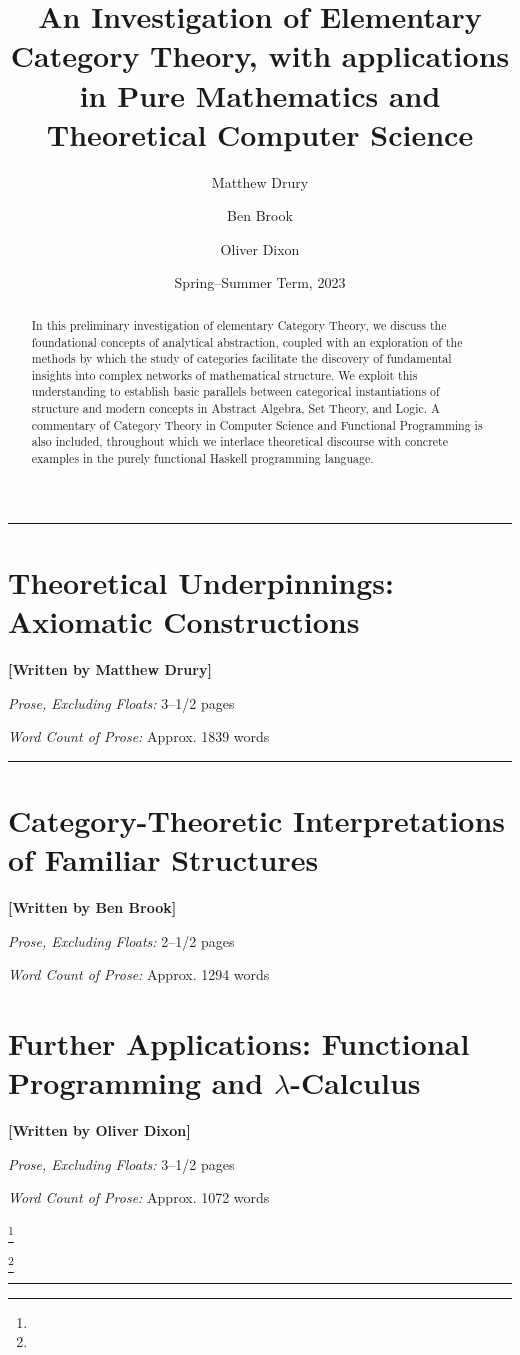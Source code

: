 \documentclass[10pt,a4paper,reqno]{amsart}
\title[\plainshorttitle]{An Investigation of Elementary Category Theory, with %
        applications in Pure Mathematics and Theoretical Computer Science}
\author{Matthew Drury} \email{\yorkemail{md1499}}
\author{Ben Brook}     \email{\yorkemail{bb1170}}
\author{Oliver Dixon}  \email{\yorkemail{od641}}
\date{Spring--Summer Term, 2023}
\numberwithin{equation}{section} %
\numberwithin{listing}{section}  %
\numberwithin{figure}{section}   %
\renewcommand{\footrulewidth}{.3pt}
\renewcommand{\headrulewidth}{\footrulewidth}
\renewcommand{\headrulewidth}{0pt}
\newcommand{\anonfootnote}[1]{%
        \begingroup
        \renewcommand{\thefootnote}{}%
        \footnote{#1}%
        \addtocounter{footnote}{-1}%
        \endgroup
}
\newcommand{\startcontribution}[5]{%
        \section{\for{toc}{\texorpdfstring{\textbf{[#1]~}}{}}#3}
        \begin{flushright}
                \vspace{5pt}
                \textbf{[Written by #2]}

                \vspace{5pt}
                \textit{Prose, Excluding Floats:} #4 pages

                \textit{Word Count of Prose:} Approx. #5 words
        \end{flushright}
}
\begin{document}
\thispagestyle{firstpage}
\pagestyle{fancy}
\begin{abstract}
        In this preliminary investigation of elementary Category Theory, we
        discuss the foundational concepts of analytical abstraction, coupled
        with an exploration of the methods by which the study of categories
        facilitate the discovery of fundamental insights into complex networks
        of mathematical structure. We exploit this understanding to establish
        basic parallels between categorical instantiations of structure and
        modern concepts in Abstract Algebra, Set Theory, and Logic. A commentary
        of Category Theory in Computer Science and Functional Programming is
        also included, throughout which we interlace theoretical discourse with
        concrete examples in the purely functional Haskell programming language.
\end{abstract}
\maketitle
\tableofcontents
\vspace{-1.5\belowcaptionskip}
\par\noindent\rule{\textwidth}{\headrulewidth}
\vspace{.15em}
\startcontribution{MD}{Matthew Drury}%
        {Theoretical Underpinnings: Axiomatic Constructions}%
        {3--1/2}{1839} %

\vspace{\belowcaptionskip}
\par\noindent\rule{\textwidth}{\headrulewidth}
\vspace{-.15em}

\startcontribution{BB}{Ben Brook}%
        {Category-Theoretic Interpretations of Familiar Structures}%
        {2--1/2}{1294} %

\clearpage
\startcontribution{OD}{Oliver Dixon}%
        {Further Applications: Functional Programming and %
                \texorpdfstring{$\lambda$}{Lambda}-Calculus}%
        {3--1/2}{1072} %
\label{sec:funcprog}

\anonfootnote{\vspace{-.5em}}
\anonfootnote{%
        \raggedleft%
        \color{darkgray}{%
                [\hypersetup{linkcolor=darkgray}%
                \autoref{sec:funcprog}~is wholly dedicated to \textit{MQ}.]%
        }%
        \vspace{-\baselineskip} %
}

\par\noindent\rule{\textwidth}{\headrulewidth}
\vspace{-.5\baselineskip}
\printbibliography[title=Cited Works]
\renewcommand{\footnoterule}{}
\end{document}
